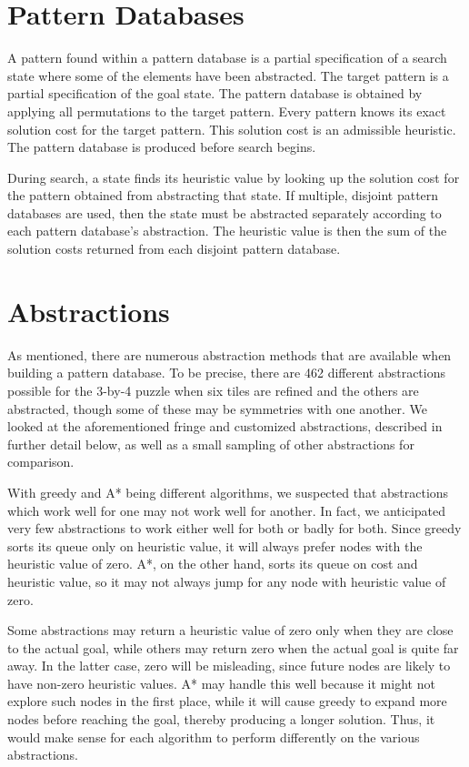\documentclass[letterpaper]{article}
\begin{document}
\section{Pattern Databases}

A pattern found within a pattern database is a partial specification of a search state where some of the elements have been abstracted.  The target pattern is a partial specification of the goal state.  The pattern database is obtained by applying all permutations to the target pattern.  Every pattern knows its exact solution cost for the target pattern.  This solution cost is an admissible heuristic.  The pattern database is produced before search begins.

During search, a state finds its heuristic value by looking up the solution cost for the pattern obtained from abstracting that state.  If multiple, disjoint pattern databases are used, then the state must be abstracted separately according to each pattern database's abstraction.  The heuristic value is then the sum of the solution costs returned from each disjoint pattern database.

\section{Abstractions}

As mentioned, there are numerous abstraction methods that are available when building a pattern database.  To be precise, there are 462 different abstractions possible for the 3-by-4 puzzle when six tiles are refined and the others are abstracted, though some of these may be symmetries with one another.  We looked at the aforementioned fringe and customized abstractions, described in further detail below, as well as a small sampling of other abstractions for comparison.

With greedy and A* being different algorithms, we suspected that abstractions which work well for one may not work well for another.  In fact, we anticipated very few abstractions to work either well for both or badly for both.  Since greedy sorts its queue only on heuristic value, it will always prefer nodes with the heuristic value of zero.  A*, on the other hand, sorts its queue on cost and heuristic value, so it may not always jump for any node with heuristic value of zero.  

Some abstractions may return a heuristic value of zero only when they are close to the actual goal, while others may return zero when the actual goal is quite far away.  In the latter case, zero will be misleading, since future nodes are likely to have non-zero heuristic values.  A* may handle this well because it might not explore such nodes in the first place, while it will cause greedy to expand more nodes before reaching the goal, thereby producing a longer solution.  Thus, it would make sense for each algorithm to perform differently on the various abstractions.
\end{document}
